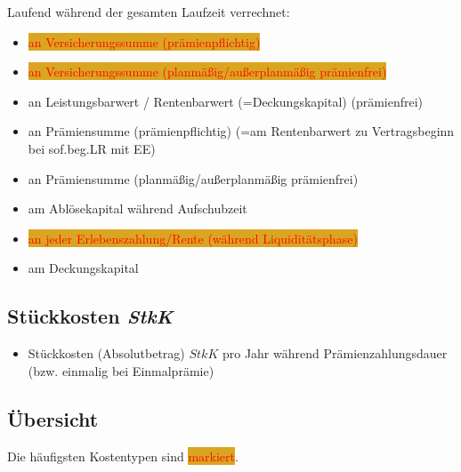\documentclass[a4paper,10pt]{article}
\newcommand{\markiert}[1]{{\setlength{\fboxsep}{0pt}\colorbox{Goldenrod}{\textcolor{red}{#1}}}}
\begin{document}
Laufend während der gesamten Laufzeit verrechnet:

\begin{itemize}
 \item \markiert{an Versicherungssumme (prämienpflichtig)}
 \item \markiert{an Versicherungssumme (planmäßig/außerplanmäßig prämienfrei)}
 \item an Leistungsbarwert / Rentenbarwert (=Deckungskapital) (prämienfrei) %
 \item an Prämiensumme (prämienpflichtig) (=am Rentenbarwert zu Vertragsbeginn bei sof.beg.LR mit EE)
 \item an Prämiensumme (planmäßig/außerplanmäßig prämienfrei)

 \item am Ablösekapital während Aufschubzeit %
 \item \markiert{an jeder Erlebenszahlung/Rente (während Liquiditätsphase)} %
 \item am Deckungskapital %
\end{itemize}


\subsection{Stückkosten \textit{StkK}}

\begin{itemize}
 \item Stückkosten (Absolutbetrag) $StkK$ pro Jahr während Prämienzahlungsdauer (bzw. einmalig bei Einmalprämie)
\end{itemize}


\subsection{Übersicht}

Die häufigsten Kostentypen sind \markiert{markiert}.
\end{document}
